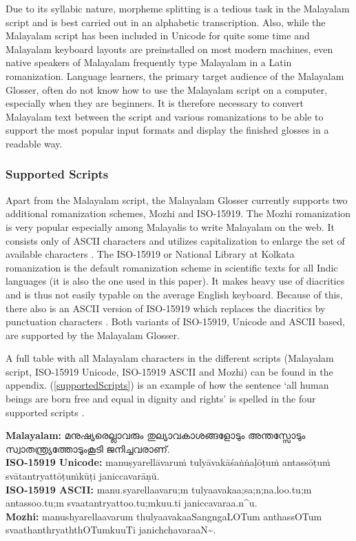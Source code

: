 \documentclass[a4paper]{article}
\begin{document}
Due to its syllabic nature, morpheme splitting is a tedious task in the Malayalam script and is best carried out in an alphabetic transcription. Also, while the Malayalam script has been included in Unicode for quite some time and Malayalam keyboard layouts are preinstalled on most modern machines, even native speakers of Malayalam frequently type Malayalam in a Latin romanization. Language learners, the primary target audience of the Malayalam Glosser, often do not know how to use the Malayalam script on a computer, especially when they are beginners. It is therefore necessary to convert Malayalam text between the script and various romanizations to be able to support the most popular input formats and display the finished glosses in a readable way.

\subsubsection{Supported Scripts}\label{scripts}

Apart from the Malayalam script, the Malayalam Glosser currently supports two additional romanization schemes, Mozhi and ISO-15919. The Mozhi romanization is very popular especially among Malayalis to write Malayalam on the web. It consists only of ASCII characters and utilizes capitalization to enlarge the set of available characters \parencite{mozhi}. The ISO-15919 or National Library at Kolkata romanization is the default romanization scheme in scientific texts for all Indic languages (it is also the one used in this paper). It makes heavy use of diacritics and is thus not easily typable on the average English keyboard. Because of this, there also is an ASCII version of ISO-15919 which replaces the diacritics by punctuation characters \parencite{iso-15919}. Both variants of ISO-15919, Unicode and ASCII based, are supported by the Malayalam Glosser.

A full table with all Malayalam characters in the different scripts (Malayalam script, ISO-15919 Unicode, ISO-15919 ASCII and Mozhi) can be found in the appendix. (\ref{supportedScripts}) is an example of how the sentence `all human beings are born free and equal in dignity and rights' is spelled in the four supported scripts \parencite{malOmniglot}.

\ex
\textbf{Malayalam:} മനുഷ്യരെല്ലാവരും തുല്യാവകാശങ്ങളോടും അന്തസ്സോടും സ്വാ\-ത\-ന്ത്ര്യ\-ത്തോ\-ടും\-കൂ\-ടി ജനിച്ചവരാണ്. \\[1ex]
\textbf{ISO-15919 Unicode:} manuṣyarellāvaruṁ tulyāvakāśaṅṅaḷōṭuṁ antassōṭ\-uṁ svātantryattōṭuṁkūṭi janiccavarāṇŭ. \\[1ex]
\textbf{ISO-15919 ASCII:} manu.syarellaavaru;m tulyaavakaa;sa;n;na.loo.tu;m antassoo.t\-u;m svaatantryattoo.tu;mkuu.ti janiccavaraa.n\^{}u. \\[1ex]
\textbf{Mozhi:} manushyarellaavarum thulyaavakaaSangngaLOTum anthassOT\-um svaathanthryaththOTumkuuTi janichchavaraaN\textasciitilde{}.
\label{supportedScripts}\xe
\end{document}
